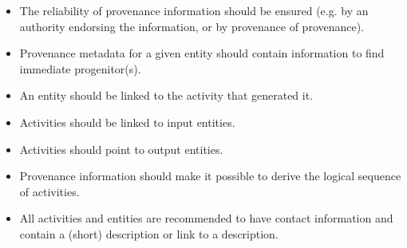 \begin{itemize}


\item The reliability of provenance information should be ensured (e.g. by an authority endorsing the information, or by provenance of provenance).

\item Provenance metadata for a given entity should contain information to find immediate progenitor(s).

\item An entity should be linked to the activity that generated it.

\item Activities should be linked to input entities.

\item Activities should point to output entities.

\item Provenance information should make it possible to derive the logical sequence of activities.



\item All activities and entities are recommended to have contact information and contain a (short) description or link to a description.

\end{itemize}

